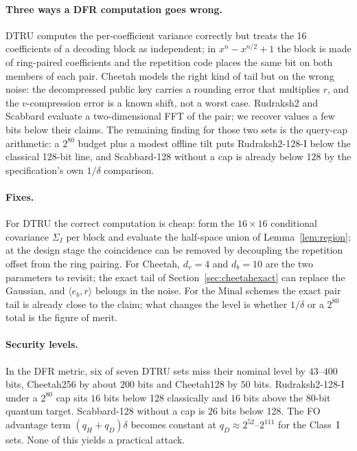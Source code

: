 \documentclass[11pt,a4paper]{article}
\theoremstyle{definition}
\theoremstyle{remark}
\newcommand{\dfr}{\delta}
\begin{document}
\paragraph{Three ways a DFR computation goes wrong.}
DTRU computes the per-coefficient variance correctly but treats the 16
coefficients of a decoding block as independent; in $x^n-x^{n/2}+1$ the
block is made of ring-paired coefficients and the repetition code places
the same bit on both members of each pair. Cheetah models the right kind of
tail but on the wrong noise: the decompressed public key carries a rounding
error that multiplies $r$, and the $v$-compression error is a known shift,
not a worst case. Rudraksh2 and Scabbard evaluate a two-dimensional FFT of
the pair; we recover values a few bits below their claims. The remaining
finding for those two sets is the query-cap arithmetic: a $2^{80}$ budget
plus a modest offline tilt puts Rudraksh2-128-I below the classical 128-bit
line, and Scabbard-128 without a cap is already below 128 by the
specification's own $1/\dfr$ comparison.

\paragraph{Fixes.}
For DTRU the correct computation is cheap: form the $16\times16$
conditional covariance $\Sigma_I$ per block and evaluate the half-space
union of Lemma~\ref{lem:region}; at the design stage the coincidence can be
removed by decoupling the repetition offset from the ring pairing. For
Cheetah, $d_v=4$ and $d_b=10$ are the two parameters to revisit; the exact
tail of Section~\ref{sec:cheetahexact} can replace the Gaussian, and
$\langle e_b,r\rangle$ belongs in the noise. For the Minal schemes the
exact pair tail is already close to the claim; what changes the level is
whether $1/\dfr$ or a $2^{80}$ total is the figure of merit.

\paragraph{Security levels.}
In the DFR metric, six of seven DTRU sets miss their nominal level by
$43$--$400$ bits, Cheetah256 by about $200$ bits and Cheetah128 by $50$
bits. Rudraksh2-128-I under a $2^{80}$ cap sits $16$ bits below 128
classically and $16$ bits above the 80-bit quantum target. Scabbard-128
without a cap is $26$ bits below 128. The FO advantage term
$(q_H+q_D)\dfr$ becomes constant at $q_D\approx2^{52}$--$2^{111}$ for the
Class~I sets. None of this yields a practical attack.
\end{document}
